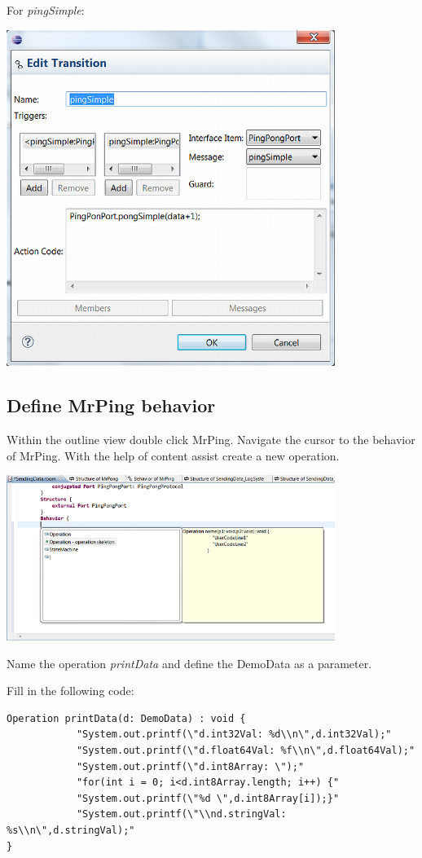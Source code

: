 For \textit{pingSimple}:

\includegraphics[width=0.8\textwidth]{images/025-SendingData06.png}


\subsection{Define MrPing behavior}

Within the outline view double click MrPing. Navigate the cursor to the behavior of MrPing. With the help 
of content assist create a new operation.

\includegraphics[width=0.8\textwidth]{images/025-SendingData07.png}

Name the operation \textit{printData} and define the DemoData as a parameter.

Fill in the following code:

\begin{small}
\begin{verbatim}
Operation printData(d: DemoData) : void {
            "System.out.printf(\"d.int32Val: %d\\n\",d.int32Val);"
            "System.out.printf(\"d.float64Val: %f\\n\",d.float64Val);"
            "System.out.printf(\"d.int8Array: \");"
            "for(int i = 0; i<d.int8Array.length; i++) {"
            "System.out.printf(\"%d \",d.int8Array[i]);}"
            "System.out.printf(\"\\nd.stringVal: %s\\n\",d.stringVal);"
}
\end{verbatim}
\end{small}


